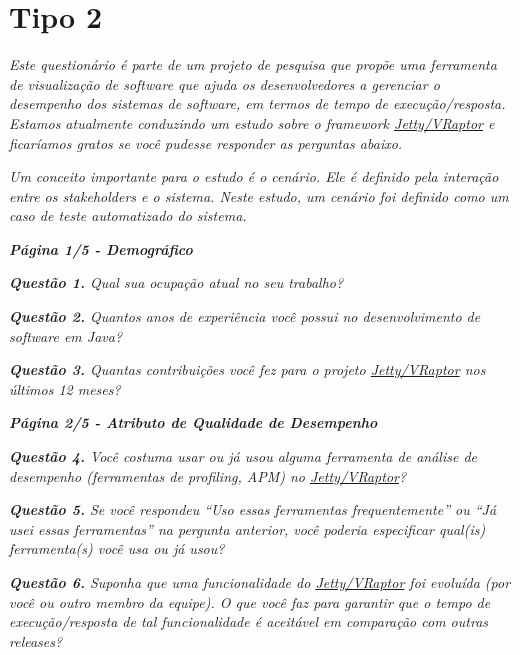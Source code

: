 \section{Tipo 2} \label{sec:apendice-a-tipo-2}

\begin{framed}
  \noindent \textit{\textbf{\toolName}}
  \par
  \par
  \noindent \textit{Este questionário é parte de um projeto de pesquisa que propõe uma ferramenta de visualização de software que ajuda os desenvolvedores a gerenciar o desempenho dos sistemas de software, em termos de tempo de execução/resposta. Estamos atualmente conduzindo um estudo sobre o framework \underline{Jetty/VRaptor} e ficaríamos gratos se você pudesse responder as perguntas abaixo.}
  \par
  \noindent \textit{Um conceito importante para o estudo é o cenário. Ele é definido pela interação entre os stakeholders e o sistema. Neste estudo, um cenário foi definido como um caso de teste automatizado do sistema.}
\end{framed}
	
\begin{framed}
	\noindent \textit{\textbf{Página 1/5 - Demográfico}}
	\par
	\noindent \textit{\textbf{Questão 1.} Qual sua ocupação atual no seu trabalho?}
	\par
	\noindent \textit{\textbf{Questão 2.} Quantos anos de experiência você possui no desenvolvimento de software em Java?}
	\par
	\noindent \textit{\textbf{Questão 3.} Quantas contribuições você fez para o projeto \underline{Jetty/VRaptor} nos últimos 12 meses?}
\end{framed}

\begin{framed}
	\noindent \textit{\textbf{Página 2/5 - Atributo de Qualidade de Desempenho}}
	\par
	\noindent \textit{\textbf{Questão 4.} Você costuma usar ou já usou alguma ferramenta de análise de desempenho (ferramentas de profiling, APM) no \underline{Jetty/VRaptor}?}
	\par
	\noindent \textit{\textbf{Questão 5.} Se você respondeu ``Uso essas ferramentas frequentemente'' ou ``Já usei essas ferramentas'' na pergunta anterior, você poderia especificar qual(is) ferramenta(s) você usa ou já usou?}
	\par
	\noindent \textit{\textbf{Questão 6.} Suponha que uma funcionalidade do \underline{Jetty/VRaptor} foi evoluída (por você ou outro membro da equipe). O que você faz para garantir que o tempo de execução/resposta de tal funcionalidade é aceitável em comparação com outras releases?}
\end{framed}

